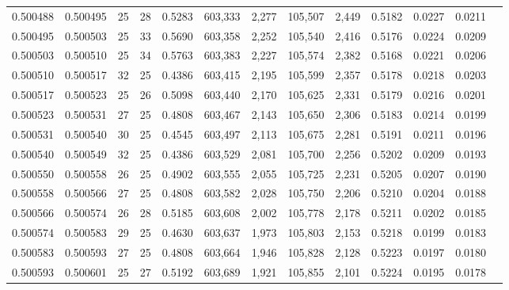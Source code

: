 \begin{tabular}{rrrrrrrrrrrrr}
0.500488 & 0.500495 &    25 &  28 &                                     0.5283 & 603,333 &   2,277 & 105,507 &   2,449 & 0.5182 & 0.0227 & 0.0211 \\
0.500495 & 0.500503 &    25 &  33 &                                     0.5690 & 603,358 &   2,252 & 105,540 &   2,416 & 0.5176 & 0.0224 & 0.0209 \\
0.500503 & 0.500510 &    25 &  34 &                                     0.5763 & 603,383 &   2,227 & 105,574 &   2,382 & 0.5168 & 0.0221 & 0.0206 \\
0.500510 & 0.500517 &    32 &  25 &                                     0.4386 & 603,415 &   2,195 & 105,599 &   2,357 & 0.5178 & 0.0218 & 0.0203 \\
0.500517 & 0.500523 &    25 &  26 &                                     0.5098 & 603,440 &   2,170 & 105,625 &   2,331 & 0.5179 & 0.0216 & 0.0201 \\
0.500523 & 0.500531 &    27 &  25 &                                     0.4808 & 603,467 &   2,143 & 105,650 &   2,306 & 0.5183 & 0.0214 & 0.0199 \\
0.500531 & 0.500540 &    30 &  25 &                                     0.4545 & 603,497 &   2,113 & 105,675 &   2,281 & 0.5191 & 0.0211 & 0.0196 \\
0.500540 & 0.500549 &    32 &  25 &                                     0.4386 & 603,529 &   2,081 & 105,700 &   2,256 & 0.5202 & 0.0209 & 0.0193 \\
0.500550 & 0.500558 &    26 &  25 &                                     0.4902 & 603,555 &   2,055 & 105,725 &   2,231 & 0.5205 & 0.0207 & 0.0190 \\
0.500558 & 0.500566 &    27 &  25 &                                     0.4808 & 603,582 &   2,028 & 105,750 &   2,206 & 0.5210 & 0.0204 & 0.0188 \\
0.500566 & 0.500574 &    26 &  28 &                                     0.5185 & 603,608 &   2,002 & 105,778 &   2,178 & 0.5211 & 0.0202 & 0.0185 \\
0.500574 & 0.500583 &    29 &  25 &                                     0.4630 & 603,637 &   1,973 & 105,803 &   2,153 & 0.5218 & 0.0199 & 0.0183 \\
0.500583 & 0.500593 &    27 &  25 &                                     0.4808 & 603,664 &   1,946 & 105,828 &   2,128 & 0.5223 & 0.0197 & 0.0180 \\
0.500593 & 0.500601 &    25 &  27 &                                     0.5192 & 603,689 &   1,921 & 105,855 &   2,101 & 0.5224 & 0.0195 & 0.0178 \\

\end{tabular}
